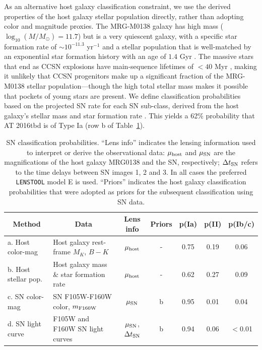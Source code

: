 \documentclass[12pt]{article}
\def\SNABC{AT 2016tbd\xspace}
\def\lenstool{{\tt LENSTOOL}\xspace}
\begin{document}
{As an alternative host galaxy classification constraint, we use the derived properties of the host galaxy stellar population directly,  rather than adopting color and magnitude proxies. The MRG-M0138 galaxy has high mass ($\log_{10}(M/M_{\odot})=11.7$) but is a very quiescent galaxy, with a specific star formation rate of $\sim10^{-11.3}$ yr$^{-1}$  and a stellar population that is well-matched by an exponential star formation history with an age of $1.4$ Gyr \cite{newman_resolving_2018}. 
The massive stars that end as CCSN explosions have main-sequence lifetimes of $<40$ Myr \cite{smartt_progenitors_2009},  making it unlikely that CCSN progenitors make up a significant fraction of the MRG-M0138 stellar population---though the high total stellar mass makes it possible that pockets of young stars are present.  We define classification probabilities based on the projected SN rate for each SN sub-class, derived from the host galaxy's stellar mass and star formation rate \cite{li_rates_2012}.  This yields a 62\% probability that \SNABC is of Type Ia (row b of Table~\ref{tab:classification}).

\begin{table}[tb]
    \centering
    \begin{tabular}{lp{1.5in}cc|ccc}
        \multicolumn{1}{c}{Method} & \multicolumn{1}{c}{Data} & Lens info & Priors & p(Ia) & p(II) & p(Ib/c) \\
        \midrule
        a. Host color-mag & Host galaxy rest-frame $M_K$, $B-K$ & $\mu_{\rm host}$ & - & 0.75 & 0.19 & 0.06\\
        b. Host stellar pop. & Host galaxy mass \& star formation rate & $\mu_{\rm host}$ & - & 0.62 & 0.27 & 0.09 \\
        c. SN color-mag & SN F105W-F160W color, $m_{\rm F160W}$ & $\mu_{\rm SN}$ & b & 0.95 & 0.01 & 0.04\\
        d. SN light curve & F105W and F160W SN light curves & $\mu_{\rm SN}$, $\Delta t_{\rm SN}$ & b & 0.94 & 0.06 & $<$0.01 \\
    \end{tabular}
    \caption{SN classification probabilities. ``Lens info'' indicates the lensing information used to interpret or derive the 
    observational data: $\mu_{\rm host}$ and $\mu_{\rm SN}$ are the magnifications of the host galaxy MRG0138 and the SN, respectively; $\Delta t_{\rm SN}$ refers to the time delays between SN images 1, 2 and 3. In all cases the preferred \lenstool model E is used.  ``Priors'' indicates the host galaxy classification probabilities that were adopted as priors for the subsequent classification using SN data.}
    \label{tab:classification}
\end{table}


}
\end{document}
